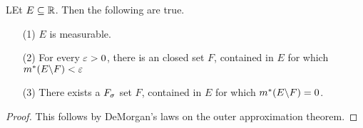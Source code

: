 \begin{theorem}\label{8.4.1}
    LEt $E \subseteq \mathbb{R}$. Then the following are true.
    \begin{enumerate}
        \item[(1)] $E$ is measurable.

        \item[(2)] For every $\varepsilon>0$, there is an closed set $F$, contained in $E$
            for which $m^\ast(E \backslash F)<\varepsilon$

        \item[(3)] There exists a $F_\sigma$ set  $F$, contained in $E$ for which
            $m^\ast(E \backslash F)=0$.
    \end{enumerate}
\end{theorem}
\begin{proof}
    This follows by DeMorgan's laws on the outer approximation theorem.
\end{proof}

